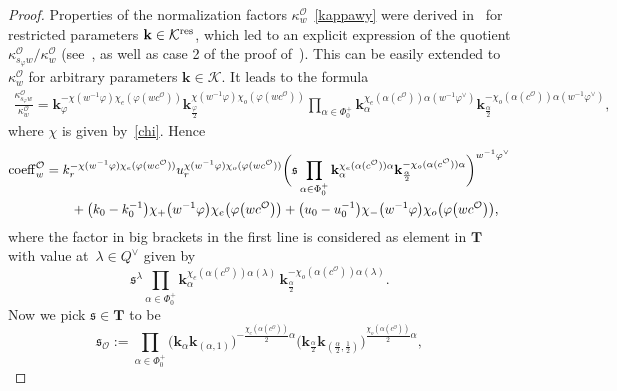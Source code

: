 \documentclass[pdftex]{sigma}
\numberwithin{equation}{section}
\begin{document}
\begin{proof}
Properties of the normalization factors $\kappa_w^\mathcal{O}$~\eqref{kappawy}
were derived in~\cite{SSV2} for restricted parameters $\mathbf{k}\in\mathcal{K}^{{\rm res}}$, which led to an explicit expression of the quotient $\kappa_{s_\varphi w}^\mathcal{O}/\kappa_w^\mathcal{O}$ (see~\cite[Lemma 5.6\,(1)]{SSV2}, as well as case 2 of the proof of~\cite[Lemma 5.9]{SSV2}).
This can be easily extended to $\kappa_w^\mathcal{O}$ for arbitrary parameters $\mathbf{k}\in\mathcal{K}$. It leads to the formula
\begin{gather*}
\frac{\kappa_{s_\varphi w}^\mathcal{O}}{\kappa_w^\mathcal{O}}=\mathbf{k}_\varphi^{-\chi(w^{-1}\varphi)\chi_e(\varphi(wc^\mathcal{O}))}
\mathbf{k}_{\frac{\varphi}{2}}^{\chi(w^{-1}\varphi)\chi_o(\varphi(wc^\mathcal{O}))}
\prod_{\alpha\in\Phi_0^+}\mathbf{k}_\alpha^{\chi_e(\alpha(c^\mathcal{O}))\alpha(w^{-1}\varphi^\vee)}\mathbf{k}_{\frac{\alpha}{2}}^{-\chi_o(\alpha(c^\mathcal{O}))\alpha(w^{-1}\varphi^\vee)},
\end{gather*}
where $\chi$ is given by~\eqref{chi}. Hence
\begin{gather*}
{\rm coeff}_w^\mathcal{O}=k_r^{-\chi(w^{-1}\varphi)\chi_e(\varphi(wc^\mathcal{O}))}u_r^{\chi(w^{-1}\varphi)\chi_o(\varphi(wc^\mathcal{O}))}
\biggl(\mathfrak{s}\prod_{\alpha\in\Phi_0^+}\mathbf{k}_\alpha^{\chi_e(\alpha(c^\mathcal{O}))\alpha} \mathbf{k}_{\frac{\alpha}{2}}^{-\chi_o(\alpha(c^\mathcal{O}))\alpha}\biggr)^{w^{-1}\varphi^\vee}\\
\hphantom{{\rm coeff}_w^\mathcal{O}=}{}
+\bigl(k_0-k_0^{-1}\bigr)\chi_+\bigl(w^{-1}\varphi\bigr)\chi_e\bigl(\varphi\bigl(wc^\mathcal{O}\bigr)\bigr)+
\bigl(u_0-u_0^{-1}\bigr)\chi_-\bigl(w^{-1}\varphi\bigr)\chi_o\bigl(\varphi\bigl(wc^\mathcal{O}\bigr)\bigr),
\end{gather*}
where the factor in big brackets in the first line is considered as element in $\mathbf{T}$ with value at~${\lambda\in Q^\vee}$ given by
\[
\mathfrak{s}^\lambda\prod_{\alpha\in\Phi_0^+}\mathbf{k}_\alpha^{\chi_e(\alpha(c^\mathcal{O}))\alpha(\lambda)}\,\mathbf{k}_{\frac{\alpha}{2}}^{-\chi_o(\alpha(c^\mathcal{O}))\alpha(\lambda)}.
\]
Now we pick $\mathfrak{s}\in\mathbf{T}$ to be
\begin{equation}\label{s}
\mathfrak{s}_\mathcal{O}:=\prod_{\alpha\in\Phi_0^+}\bigl(\mathbf{k}_{\alpha}\mathbf{k}_{(\alpha,1)}\bigr)^{-\frac{\chi_e(\alpha(c^\mathcal{O}))}{2}\alpha}
\bigl(\mathbf{k}_{\frac{\alpha}{2}}\mathbf{k}_{(\frac{\alpha}{2},\frac{1}{2})}\bigr)^{\frac{\chi_o(\alpha(c^\mathcal{O}))}{2}\alpha},
\end{equation}

\end{proof}
\end{document}
